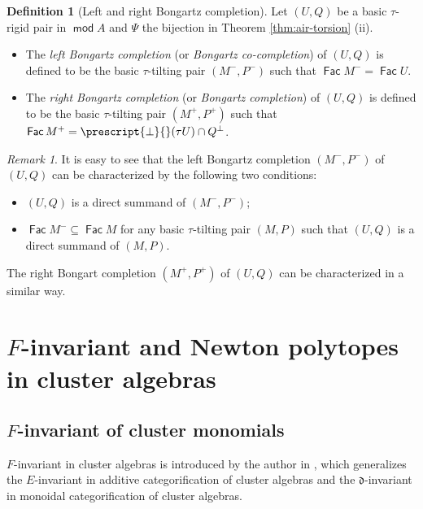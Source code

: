 \documentclass[10pt]{amsart}
\theoremstyle{definition}
\newtheorem{definition}[theorem]{Definition}
\theoremstyle{remark}
\newtheorem{remark}[theorem]{Remark}
\numberwithin{equation}{section}
\def\mod{\opname{mod}\nolimits}
\newcommand{\opname}[1]{\operatorname{\mathsf{#1}}}
\newcommand{\Fac}{\opname{Fac}}
\begin{document}
\begin{definition}[Left and right Bongartz completion]\label{def:comp}
Let $(U,Q)$ be a basic $\tau$-rigid pair in $\mod A$ and  $\Psi$ the bijection in Theorem \ref{thm:air-torsion} (ii).
\begin{itemize}
\item[(i)] The {\em left Bongartz completion} (or {\em Bongartz co-completion}) of $(U,Q)$ is defined to be the basic $\tau$-tilting pair $(M^-,P^-)$ such that $\Fac M^-=\Fac U$.

 \item[(ii)] The {\em right Bongartz completion}  (or {\em Bongartz completion}) of $(U,Q)$ is defined to be the basic $\tau$-tilting pair 
 $(M^+,P^+)$ such that $\Fac M^+=\prescript{\bot}{}({\tau U})\cap Q^\bot$.
\end{itemize}
\end{definition}
\begin{remark}\label{rmk:left-completion}
 It is easy to see that the left Bongartz completion $(M^-,P^-)$ of $(U,Q)$
 can be characterized by the following two conditions:
 \begin{itemize}
     \item [(a)] $(U,Q)$ is a direct summand of $(M^-,P^-)$;
     \item[(b)] $\Fac M^-\subseteq \Fac M$ for any basic $\tau$-tilting pair $(M,P)$ such that $(U,Q)$ is a direct summand of $(M,P)$.
 \end{itemize}
 The right Bongart completion $(M^+,P^+)$ of $(U,Q)$ can be characterized in a similar way.
\end{remark}





\section{$F$-invariant and Newton polytopes in cluster algebras}

\subsection{$F$-invariant of cluster monomials}\label{sec:F-cluster}


$F$-invariant in cluster algebras is introduced by the author in \cite{Cao-2023}, which generalizes the $E$-invariant \cite{DWZ10} in additive categorification of cluster algebras and the $\mathfrak{d}$-invariant \cite{kkko-2018,kkop-2020} in monoidal categorification of cluster algebras. 
\end{document}
